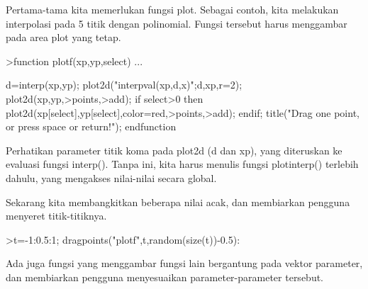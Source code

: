 \documentclass[a4paper,10pt]{article}
\begin{document}
\begin{eulernotebook}
\begin{eulercomment}
\begin{eulercomment}
\begin{eulercomment}
\begin{eulercomment}
\begin{eulercomment}
\begin{eulercomment}
\begin{eulercomment}
Pertama-tama kita memerlukan fungsi plot. Sebagai contoh, kita melakukan interpolasi
pada 5 titik dengan polinomial. Fungsi tersebut harus menggambar pada area plot yang
tetap.
\end{eulercomment}
\begin{eulerprompt}
>function plotf(xp,yp,select) ...
\end{eulerprompt}
\begin{eulerudf}
    d=interp(xp,yp);
    plot2d("interpval(xp,d,x)";d,xp,r=2);
    plot2d(xp,yp,>points,>add);
    if select>0 then
      plot2d(xp[select],yp[select],color=red,>points,>add);
    endif;
    title("Drag one point, or press space or return!");
  endfunction
\end{eulerudf}
\begin{eulercomment}
Perhatikan parameter titik koma pada plot2d (d dan xp), yang diteruskan ke evaluasi
fungsi interp(). Tanpa ini, kita harus menulis fungsi plotinterp() terlebih dahulu,
yang mengakses nilai-nilai secara global.

Sekarang kita membangkitkan beberapa nilai acak, dan membiarkan pengguna menyeret
titik-titiknya.
\end{eulercomment}
\begin{eulerprompt}
>t=-1:0.5:1; dragpoints("plotf",t,random(size(t))-0.5):
\end{eulerprompt}
\begin{eulercomment}
Ada juga fungsi yang menggambar fungsi lain bergantung pada vektor parameter, dan
membiarkan pengguna menyesuaikan parameter-parameter tersebut.


\end{eulercomment}
\end{eulercomment}
\end{eulercomment}
\end{eulercomment}
\end{eulercomment}
\end{eulercomment}
\end{eulercomment}
\end{eulernotebook}
\end{document}
